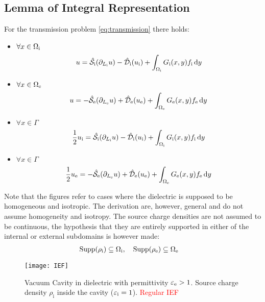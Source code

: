 \subsection{Lemma of Integral Representation}
For the transmission problem \ref{eq:transmission} there holds:
\begin{itemize}
\item $\forall x \in \Omega_\mathrm{i}$
\begin{equation}
u = \hat{\mathcal{S}}_\mathrm{i}(\partial_{L_\mathrm{i}} u)
- \hat{\mathcal{D}}_\mathrm{i}(u_\mathrm{i}) + \int_{\Omega_\mathrm{i}} G_\mathrm{i}(x, y) f_\mathrm{i}\mathop{}\!\mathrm{d} y
\end{equation}
\item $\forall x \in \Omega_\mathrm{e}$
\begin{equation}
u = -\hat{\mathcal{S}}_\mathrm{e}(\partial_{L_\mathrm{e}} u)
+ \hat{\mathcal{D}}_\mathrm{e}(u_\mathrm{e}) + \int_{\Omega_\mathrm{e}}G_\mathrm{e}(x, y) f_\mathrm{e}\mathop{}\!\mathrm{d} y
\end{equation}
\item $\forall x \in \Gamma$
  \begin{equation}\label{eq:stat3}
    \frac{1}{2}u_\mathrm{i} = \hat{\mathcal{S}}_\mathrm{i}(\partial_{L_\mathrm{i}} u)
    - \hat{\mathcal{D}}_\mathrm{i}(u_\mathrm{i}) + \int_{\Omega_\mathrm{i}}G_\mathrm{i}(x, y) f_\mathrm{i}\mathop{}\!\mathrm{d} y
  \end{equation}
\item $\forall x \in \Gamma$
  \begin{equation}\label{eq:stat4}
    \frac{1}{2}u_\mathrm{e} = -\hat{\mathcal{S}}_\mathrm{e}(\partial_{L_\mathrm{e}} u)
    + \hat{\mathcal{D}}_\mathrm{e}(u_\mathrm{e}) + \int_{\Omega_\mathrm{e}}G_\mathrm{e}(x, y) f_\mathrm{e}\mathop{}\!\mathrm{d} y
  \end{equation}
\end{itemize}

Note that the figures refer to cases where the dielectric is supposed to
be homogeneous and isotropic. The derivation are, however, general and
do not assume homogeneity and isotropy.
The source charge densities are not assumed to be continuous, the
hypothesis that they are entirely supported in either of the internal or
external subdomains is however made:
\begin{alignat}{2}
  \mathop{}\!\mathrm{Supp}(\rho_\mathrm{i}) \subseteq \Omega_\mathrm{i}, \quad& \mathop{}\!\mathrm{Supp}(\rho_\mathrm{e}) \subseteq \Omega_\mathrm{e}
\end{alignat}

\begin{figure}[h!]
  \centering
  \texttt{[image: IEF]}
  \caption{Vacuum Cavity in dielectric with permittivity $\varepsilon_\mathrm{e}>1$.
  Source charge density $\rho_\mathrm{i}$ inside the cavity
  ($\varepsilon_\mathrm{i}=1$). \textcolor{red}{Regular \acs{IEF}}}
  \label{fig:case0}
\end{figure}

